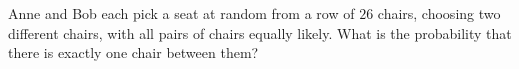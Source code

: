 Anne and Bob each pick a seat at random from a row of $26$ chairs, choosing two different chairs, with all pairs of chairs equally likely. What is the probability that there is exactly one chair between them?
